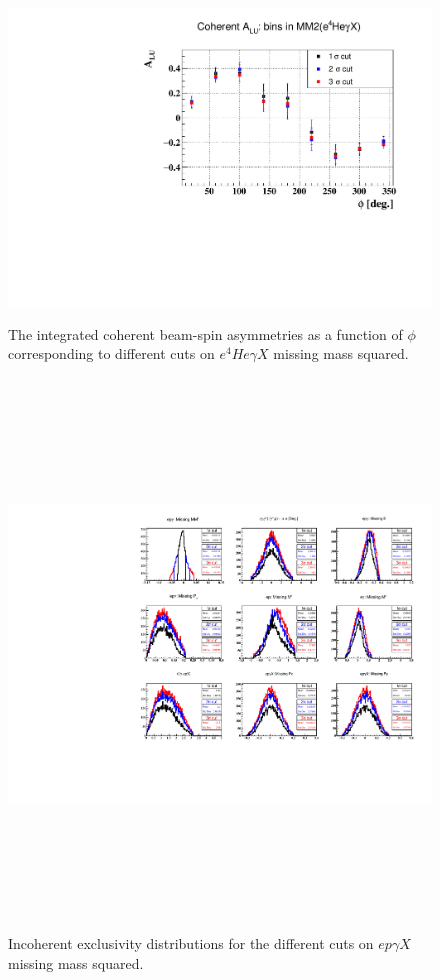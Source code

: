 \begin{enumerate}
\begin{enumerate}
\begin{enumerate}
    \begin{figure}[tbp]
       \centering
    \includegraphics[height=8.6cm]{fig/ALU_coherent_MM2.pdf}
    \caption{The integrated coherent beam-spin asymmetries as a function of 
    $\phi$ corresponding to different cuts on $e^{4}He\gamma X$ missing mass 
 squared.}
    \label{fig:exc_coh-alu}
    \end{figure} 

    \begin{figure}[tbp]
    \includegraphics[height=14.6cm]{fig/all_sigmas_incoh_exc_cuts.pdf}
    \caption{ Incoherent exclusivity distributions for the different cuts on 
    $ep\gamma X$ missing mass squared.}
    \label{fig:exc_InCoh}
    \end{figure}                                                                  



\end{enumerate}
\end{enumerate}
\end{enumerate}
